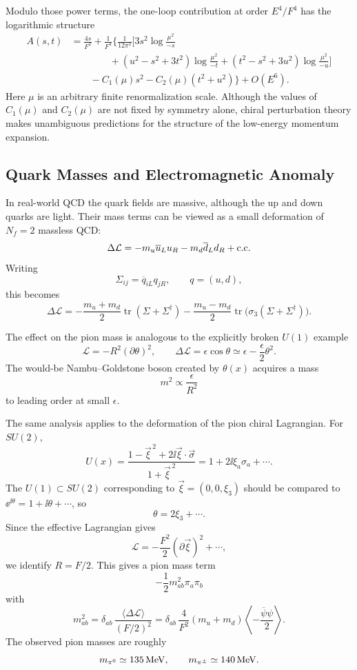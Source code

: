 Modulo those power terms, the one-loop contribution at order \(E^4/F^4\)
has the logarithmic structure
\[
\begin{aligned}
  A(s,t)
  &=
  \frac{4s}{F^2}
  +\frac1{F^4}
  \biggl\{
    \frac1{12\pi^2}
    \biggl[
      3s^2\log\frac{\mu^2}{-s}
\\
  &\qquad\qquad
      +(u^2-s^2+3t^2)\log\frac{\mu^2}{-t}
      +(t^2-s^2+3u^2)\log\frac{\mu^2}{-u}
    \biggr]
\\
  &\qquad
    -C_1(\mu)s^2
    -C_2(\mu)(t^2+u^2)
  \biggr\}
  +O(E^6).
\end{aligned}
\]
Here \(\mu\) is an arbitrary finite renormalization scale.  Although the
values of \(C_1(\mu)\) and \(C_2(\mu)\) are not fixed by symmetry alone,
chiral perturbation theory makes unambiguous predictions for the
structure of the low-energy momentum expansion.

\subsection{Quark Masses and Electromagnetic Anomaly}

In real-world QCD the quark fields are massive, although the up and down
quarks are light.  Their mass terms can be viewed as a small deformation
of \(N_f=2\) massless QCD:
\[
  \Delta\mathcal L
  =
  -m_u\overline u_Lu_R
  -m_d\overline d_Ld_R
  +\hbox{c.c.}
\]
Writing
\[
  \Sigma_{ij}=\overline q_{iL}q_{jR},
  \qquad
  q=(u,d),
\]
this becomes
\[
  \Delta\mathcal L
  =
  -\frac{m_u+m_d}{2}\operatorname{tr}(\Sigma+\Sigma^\dagger)
  -\frac{m_u-m_d}{2}
  \operatorname{tr}\bigl(\sigma_3(\Sigma+\Sigma^\dagger)\bigr).
\]

The effect on the pion mass is analogous to the explicitly broken
\(U(1)\) example
\[
  \mathcal L=-R^2(\partial\theta)^2,
  \qquad
  \Delta\mathcal L=\epsilon\cos\theta
  \simeq
  \epsilon-\frac{\epsilon}{2}\theta^2.
\]
The would-be Nambu--Goldstone boson created by \(\theta(x)\) acquires a
mass
\[
  m^2\propto \frac{\epsilon}{R^2}
\]
to leading order at small \(\epsilon\).

The same analysis applies to the deformation of the pion chiral
Lagrangian.  For \(SU(2)\),
\[
  U(x)=\frac{1-\vec\xi^{\,2}+2\ii\vec\xi\cdot\vec\sigma}
       {1+\vec\xi^{\,2}}
  =
  1+2\ii\xi_a\sigma_a+\cdots .
\]
The \(U(1)\subset SU(2)\) corresponding to
\(\vec\xi=(0,0,\xi_3)\) should be compared to
\(\ee^{\ii\theta}=1+\ii\theta+\cdots\), so
\[
  \theta=2\xi_3+\cdots .
\]
Since the effective Lagrangian gives
\[
  \mathcal L=-\frac{F^2}{2}(\partial\vec\xi)^2+\cdots,
\]
we identify \(R=F/2\).  This gives a pion mass term
\[
  -\frac12m_{ab}^2\pi_a\pi_b
\]
with
\[
  m_{ab}^2
  =
  \delta_{ab}\,
  \frac{\langle\Delta\mathcal L\rangle}{(F/2)^2}
  =
  \delta_{ab}\,
  \frac4{F^2}(m_u+m_d)
  \left\langle-\frac{\overline\psi\psi}{2}\right\rangle .
\]
The observed pion masses are roughly
\[
  m_{\pi^0}\simeq135\,{\rm MeV},
  \qquad
  m_{\pi^\pm}\simeq140\,{\rm MeV}.
\]

